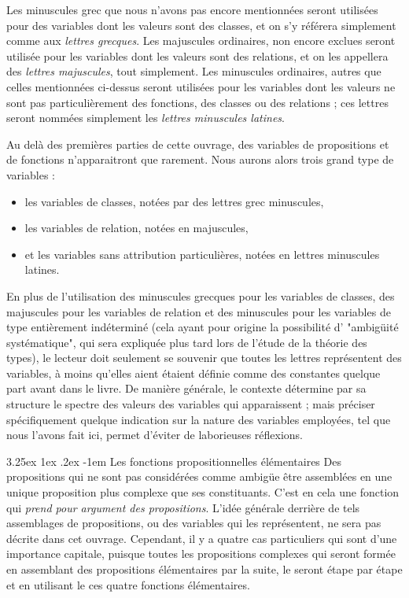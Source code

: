 \documentclass[a4paper]{book}
\makeatletter
\renewcommand\paragraph{\@startsection{paragraph}{5}{\z@}%
  {3.25ex \@plus1ex \@minus.2ex}%
  {-1em}%
  {\normalfont\normalsize\bfseries}}
\makeatother
\begin{document}
Les minuscules grec que nous n'avons pas encore mentionnées seront utilisées pour des variables dont les valeurs sont des classes, et on s'y référera simplement comme aux \textit{lettres grecques}. Les majuscules ordinaires, non encore exclues seront utilisée pour les variables dont les valeurs sont des relations, et on les appellera des \textit{lettres majuscules}, tout simplement. Les minuscules ordinaires, autres que celles mentionnées ci-dessus seront utilisées pour les variables dont les valeurs ne sont pas particulièrement des fonctions, des classes ou des relations ; ces lettres seront nommées simplement les \textit{lettres minuscules latines}.

Au delà des premières parties de cette ouvrage, des variables de propositions et de fonctions n'apparaitront que rarement. Nous aurons alors trois grand type de variables : 
\begin{itemize}
\item les variables de classes, notées par des lettres grec minuscules,
\item les variables de relation, notées en majuscules, 
\item et les variables sans attribution particulières, notées en lettres minuscules latines.
\end{itemize}

En plus de l'utilisation des minuscules grecques pour les variables de classes, des majuscules pour les variables de relation et des minuscules pour les variables de type entièrement indéterminé (cela ayant pour origine la possibilité d' "ambigüité systématique", qui sera expliquée plus tard lors de l'étude de la théorie des types), le lecteur doit seulement se souvenir que toutes les lettres représentent des variables, à moins qu'elles aient étaient définie comme des constantes quelque part avant dans le livre. De manière générale, le contexte détermine par sa structure le spectre des valeurs des variables qui apparaissent ; mais préciser spécifiquement quelque indication sur la nature des variables employées, tel que nous l'avons fait ici, permet d'éviter de laborieuses réflexions.

\paragraph{Les fonctions propositionnelles élémentaires} Des propositions qui ne sont pas considérées comme ambigüe  être assemblées en une unique proposition plus complexe que ses constituants. C'est en cela une fonction qui \textit{prend pour argument des propositions}. L'idée générale derrière de tels assemblages de propositions, ou des variables qui les représentent, ne sera pas décrite dans cet ouvrage. Cependant, il y a quatre cas particuliers qui sont d'une importance capitale, puisque toutes les propositions complexes qui seront formée en assemblant des propositions élémentaires par la suite, le seront étape par étape et en utilisant le ces quatre fonctions élémentaires.
\end{document}
